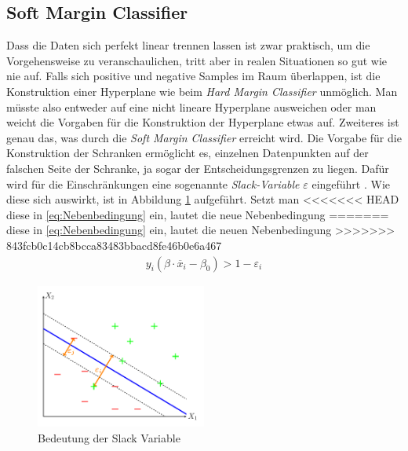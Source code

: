 \documentclass[
]{article}
\begin{document}
\subsection{Soft Margin Classifier}

Dass die Daten sich perfekt linear trennen lassen ist zwar praktisch, um
die Vorgehensweise zu veranschaulichen, tritt aber in realen Situationen
so gut wie nie auf. Falls sich positive und negative Samples im Raum
überlappen, ist die Konstruktion einer Hyperplane wie beim
\textit{Hard Margin Classifier} unmöglich. Man müsste also entweder auf
eine nicht lineare Hyperplane ausweichen oder man weicht die Vorgaben
für die Konstruktion der Hyperplane etwas auf. Zweiteres ist genau das,
was durch die \textit{Soft Margin Classifier} erreicht wird. Die Vorgabe
für die Konstruktion der Schranken ermöglicht es, einzelnen Datenpunkten
auf der falschen Seite der Schranke, ja sogar der Entscheidungsgrenzen
zu liegen. Dafür wird für die Einschränkungen eine sogenannte
\textit{Slack-Variable} \(\varepsilon\) eingeführt
\parencite{jamesIntroductionStatisticalLearning2021}. Wie diese sich
auswirkt, ist in Abbildung \ref{fig:slackvariable} aufgeführt. Setzt man
<<<<<<< HEAD
diese in \eqref{eq:Nebenbedingung} ein, lautet die neue Nebenbedingung
=======
diese in \eqref{eq:Nebenbedingung} ein, lautet die neuen Nebenbedingung
>>>>>>> 843fcb0c14cb8bcca83483bbacd8fe46b0e6a467
\begin{align}
y_i(\beta \cdot \overline{x}_i-\beta_0)>1- \varepsilon_i \label{eq:nebbedsfm}
\end{align}

\begin{figure}[htb]
\centering
\includegraphics[width=0.5\textwidth,trim=0.5cm 0.5cm 0.5cm 0.5cm]{Images/slackvariable.pdf} 
        \caption{Bedeutung der Slack Variable}
        \label{fig:slackvariable}
\end{figure}
\end{document}
